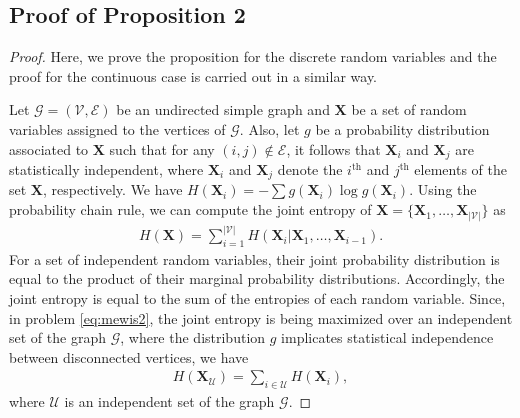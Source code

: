 \documentclass{article}
\begin{document}
\subsection{Proof of Proposition 2}
\begin{proof}
	Here, we prove the proposition for the discrete random variables and the proof for the continuous case is carried out in a similar way.
	
	Let $\mathcal{G} = (\mathcal{V}, \mathcal{E})$ be an undirected simple graph and $\mathbf{X}$ be a set of random variables assigned to the vertices of $\mathcal{G}$. Also, let $g$ be a probability distribution associated to $\mathbf{X}$ such that for any $(i, j) \notin \mathcal{E}$, it follows that $\mathbf{X}_i$ and $\mathbf{X}_j$ are statistically independent, where $\mathbf{X}_i$ and $\mathbf{X}_j$ denote the $i^\textrm{th}$ and $j^\textrm{th}$ elements of the set $\mathbf{X}$, respectively. We have $H(\mathbf{X}_i) = -\sum g(\mathbf{X}_i)\log g(\mathbf{X}_i)$. 
	Using the probability chain rule, we can compute the joint entropy of $\mathbf{X} = \{\mathbf{X}_1,\dots,\mathbf{X}_{|\mathcal{V}|}\}$ as
	\begin{gather}
		H(\mathbf{X}) = \sum_{i=1}^{|\mathcal{V}|} H(\mathbf{X}_i|\mathbf{X}_1,\dots,\mathbf{X}_{i-1}).
	\end{gather}
	For a set of independent random variables, their joint probability distribution is equal to the product of their marginal probability distributions. Accordingly, the joint entropy is equal to the sum of the entropies of each random variable. Since, in problem \ref{eq:mewis2}, the joint entropy is being maximized over an independent set of the graph $\mathcal{G}$, where the distribution $g$ implicates statistical independence between disconnected vertices, we have
	\begin{gather}
		H(\mathbf{X}_\mathcal{U}) = \sum_{i \in \mathcal{U}} H(\mathbf{X}_i),
	\end{gather} 
	where $\mathcal{U}$ is an independent set of the graph $\mathcal{G}$.
\end{proof}
\end{document}
